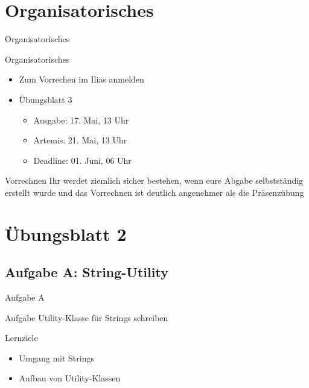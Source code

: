 \documentclass[aspectratio=169]{beamer}
\begin{document}
\section{Organisatorisches}
\begin{frame}[fragile]{Organisatorisches}
  \begin{alertblock}{Organisatorisches}
    \begin{itemize}
      \item Zum Vorrechen im Ilias anmelden
      \item Übungsblatt 3 \begin{itemize}
        \item \color{nicegreen}Ausgabe: \color{FGround} 17. Mai, 13 Uhr
        \item \color{numbercolor} Artemis: \color{FGround} 21. Mai, 13 Uhr
        \item \color{alertcolor}Deadline: \color{FGround} 01. Juni, 06 Uhr
      \end{itemize}
    \end{itemize}
  \end{alertblock}
  \begin{block}{Vorrechnen}
    Ihr werdet ziemlich sicher bestehen, wenn eure Abgabe selbstständig erstellt wurde und das Vorrechnen ist deutlich angenehmer als die Präsenzübung
  \end{block}
\end{frame}

\section{Übungsblatt 2}
\subsection{Aufgabe A: String-Utility}
\begin{frame}{Aufgabe A}
  \begin{block}{Aufgabe}
    \pause
    Utility-Klasse für Strings schreiben
  \end{block}
  \pause
  \begin{block}{Lernziele}
    \begin{itemize}
      \pause
      \item Umgang mit Strings
      \pause
      \item Aufbau von Utility-Klassen
    \end{itemize}
  \end{block}
\end{frame}
\end{document}

